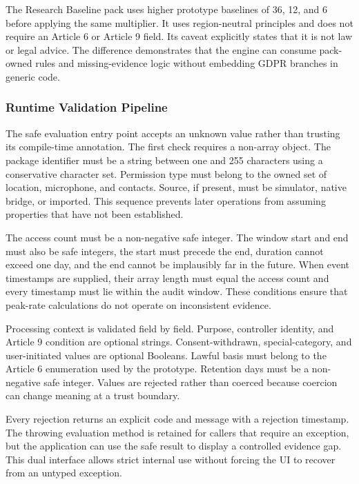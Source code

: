 The Research Baseline pack uses higher prototype baselines of 36, 12, and 6 before applying the same multiplier. It uses region-neutral principles and does not require an Article 6 or Article 9 field. Its caveat explicitly states that it is not law or legal advice. The difference demonstrates that the engine can consume pack-owned rules and missing-evidence logic without embedding GDPR branches in generic code.

\subsubsection{Runtime Validation Pipeline}

The safe evaluation entry point accepts an unknown value rather than trusting its compile-time annotation. The first check requires a non-array object. The package identifier must be a string between one and 255 characters using a conservative character set. Permission type must belong to the owned set of location, microphone, and contacts. Source, if present, must be simulator, native bridge, or imported. This sequence prevents later operations from assuming properties that have not been established.

The access count must be a non-negative safe integer. The window start and end must also be safe integers, the start must precede the end, duration cannot exceed one day, and the end cannot be implausibly far in the future. When event timestamps are supplied, their array length must equal the access count and every timestamp must lie within the audit window. These conditions ensure that peak-rate calculations do not operate on inconsistent evidence.

Processing context is validated field by field. Purpose, controller identity, and Article 9 condition are optional strings. Consent-withdrawn, special-category, and user-initiated values are optional Booleans. Lawful basis must belong to the Article 6 enumeration used by the prototype. Retention days must be a non-negative safe integer. Values are rejected rather than coerced because coercion can change meaning at a trust boundary.

Every rejection returns an explicit code and message with a rejection timestamp. The throwing evaluation method is retained for callers that require an exception, but the application can use the safe result to display a controlled evidence gap. This dual interface allows strict internal use without forcing the UI to recover from an untyped exception.

